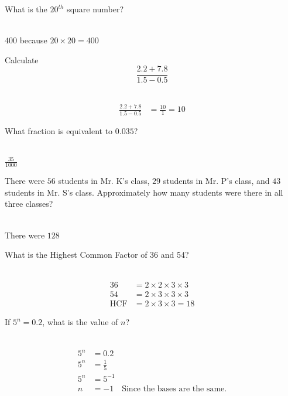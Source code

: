 \documentclass[addpoints,12pt]{exam}
\begin{document}
\begin{questions}
 \question What is the $20^{th}$ square number?
	\ifprintanswers
	  \begin{solution}\\
		$400$ because $20\times20=400$
	  \end{solution}
	\else
	  \makeemptybox{1.33in}
	\fi
 
 \question Calculate $$\frac{2.2+7.8}{1.5-0.5}$$
	\ifprintanswers
	  \begin{solution}\\
		\begin{align}
		  \frac{2.2+7.8}{1.5-0.5} &= \frac{10}{1} = 10
		\end{align}
	  \end{solution}
	\else
	  \makeemptybox{1.33in}
	\fi
 
 \question What fraction is equivalent to $0.035$?
	\ifprintanswers
	  \begin{solution}\\
		$\frac{35}{1000}$
	  \end{solution}
	\else
	  \makeemptybox{1.33in}
	\fi
 \question There were $56$ students in Mr. K's class, $29$ students in Mr. P's class, and $43$ 
students in Mr. S's class. Approximately how many students were there in all three classes?
	\ifprintanswers
	  \begin{solution}\\
		There were $128$
	  \end{solution}
	\else
	  \makeemptybox{1.33in}
	\fi
 \question What is the Highest Common Factor of 36 and 54?
	\ifprintanswers
	  \begin{solution}\\
		\begin{align}
		  36 &= 2\times2\times3\times3 \\
		  54 &= 2\times3\times3\times3 \\
		  \text{HCF} &= 2\times3\times3 = 18
		\end{align}
	  \end{solution}
	\else
	  \makeemptybox{1.33in}
	\fi
 
 \question If $5^n = 0.2$, what is the value of $n$?
	\ifprintanswers
	  \begin{solution}\\
		\begin{align}
		  5^n &= 0.2 \\
		  5^n &= \frac{1}{5} \\
		  5^n &= 5^{-1} \\
		  n &= -1 \quad \text{Since the bases are the same.}
		\end{align}
	  \end{solution}
	\else
	  \makeemptybox{1.33in}
	\fi
 

\end{questions}
\end{document}
